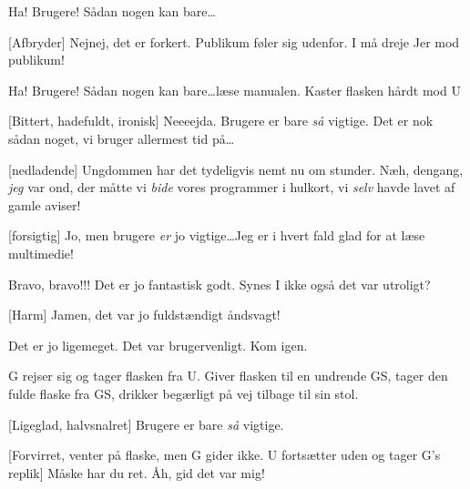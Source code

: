 \documentclass[a4paper,11pt]{article}
\begin{document}
\begin{sketch}
  
  Ha! Brugere! Sådan nogen kan bare\ldots
  
  [Afbryder] Nejnej, det er forkert. Publikum føler sig
  udenfor. I må dreje Jer mod publikum!
  
  
  Ha! Brugere! Sådan nogen kan bare\ldots læse manualen. \act
  {Kaster flasken hårdt mod U}
  
  [Bittert, hadefuldt, ironisk] Neeeejda. Brugere er bare
  \emph{så} vigtige. Det er nok sådan noget, vi bruger allermest tid
  på\ldots
  
  
  [nedladende] Ungdommen har det tydeligvis nemt nu om
  stunder. Næh, dengang, \emph{jeg} var ond, der måtte vi \emph{bide}
  vores programmer i hulkort, vi \emph{selv} havde lavet af gamle
  aviser!
  
  
  [forsigtig] Jo, men brugere \emph{er} jo vigtige\ldots Jeg
  er i hvert fald glad for at læse multimedie!
  
  
    Bravo, bravo!!! Det er jo fantastisk
  godt.   Synes I ikke også det var
  utroligt?
  
  [Harm] Jamen, det var jo fuldstændigt åndsvagt!
  
   Det er jo ligemeget.  Det
  var brugervenligt. Kom igen.
  
  \scene G rejser sig og tager flasken fra U. Giver flasken til en
  undrende GS, tager den fulde flaske fra GS, drikker begærligt på vej
  tilbage til sin stol.
  
  [Ligeglad, halvsnalret] Brugere er bare \emph{så} vigtige.
  
  [Forvirret, venter på flaske, men G gider ikke. U fortsætter
  uden og tager G's replik] Måske har du ret. Åh, gid det var mig!
  

\end{sketch}
\end{document}
